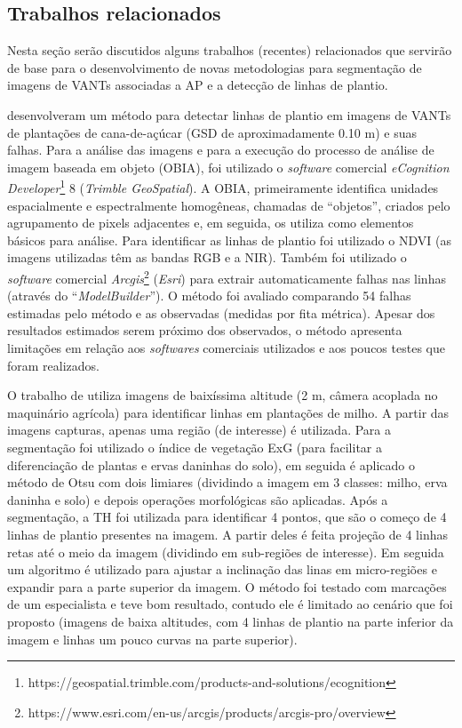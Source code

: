 \documentclass[12pt, a4paper, english, brazil]{article}
\begin{document}

\subsection{Trabalhos relacionados}

Nesta seção serão discutidos alguns trabalhos (recentes) relacionados que servirão de base para o desenvolvimento de novas metodologias para segmentação de imagens de VANTs associadas a AP e a detecção de linhas de plantio.

 desenvolveram um método para detectar linhas de plantio em imagens de VANTs de plantações de cana-de-açúcar (GSD de aproximadamente 0.10 m) e suas falhas. Para a análise das imagens e para a execução do processo de análise de imagem baseada em objeto (OBIA), foi utilizado o \textit{software} comercial \textit{eCognition Developer}\footnote{https://geospatial.trimble.com/products-and-solutions/ecognition} 8 (\textit{Trimble GeoSpatial}). A OBIA, primeiramente identifica unidades espacialmente e espectralmente homogêneas, chamadas de ``objetos'', criados pelo agrupamento de pixels adjacentes e, em seguida, os utiliza como elementos básicos para análise. Para identificar as linhas de plantio foi utilizado o NDVI (as imagens utilizadas têm as bandas RGB e a NIR). Também foi utilizado o \textit{software} comercial \textit{Arcgis}\footnote{https://www.esri.com/en-us/arcgis/products/arcgis-pro/overview} (\textit{Esri}) para extrair automaticamente falhas nas linhas (através do ``\textit{ModelBuilder}''). O método foi avaliado comparando 54 falhas estimadas pelo método e as observadas (medidas por fita métrica). Apesar dos resultados estimados serem próximo dos observados, o método apresenta limitações em relação aos \textit{softwares} comerciais utilizados e aos poucos testes que foram realizados.

O trabalho de  utiliza imagens de baixíssima altitude (2 m, câmera acoplada no maquinário agrícola) para identificar linhas em plantações de milho. A partir das imagens capturas, apenas uma região (de interesse) é utilizada. Para a segmentação foi utilizado o índice de vegetação ExG (para facilitar a diferenciação de plantas e ervas daninhas do solo), em seguida é aplicado o método de Otsu com dois limiares (dividindo a imagem em 3 classes: milho, erva daninha e solo) e depois operações morfológicas são aplicadas. Após a segmentação, a TH foi utilizada para identificar 4 pontos, que são o começo de 4 linhas de plantio presentes na imagem. A partir deles é feita projeção de 4 linhas retas até o meio da imagem (dividindo em sub-regiões de interesse). Em seguida um algoritmo é utilizado para ajustar a inclinação das linas em micro-regiões e expandir para a parte superior da imagem. O método foi testado com marcações de um especialista e teve bom resultado, contudo ele é limitado ao cenário que foi proposto (imagens de baixa altitudes, com 4 linhas de plantio na parte inferior da imagem e linhas um pouco curvas na parte superior).
\end{document}
